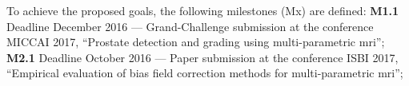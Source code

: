 To achieve the proposed goals, the following milestones (Mx) are defined:
\textbf{M1.1} Deadline December 2016 --- Grand-Challenge submission at the conference MICCAI 2017, ``Prostate detection and grading using multi-parametric \ac{mri}'';
\textbf{M2.1} Deadline October 2016 --- Paper submission at the conference ISBI 2017, ``Empirical evaluation of bias field correction methods for multi-parametric \ac{mri}'';
